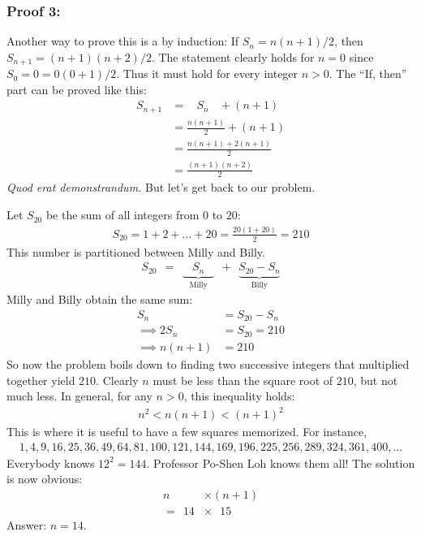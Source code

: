 \documentclass[12pt]{article}
\begin{document}
\begin{answer}
\subsubsection*{Proof 3:}
Another way to prove this is a by induction: If $S_{n}=n(n+1)/2$, then $S_{n+1}=(n+1)(n+2)/2$. The statement clearly holds for $n=0$ since $S_{0} = 0 = 0 (0+1)/2$. Thus it must hold for every integer $n>0$. The ``If, then'' part can be proved like this:
\begin{align*}
S_{n+1} 
  & = ~~~~ S_{n} ~~~~+ (n+1) \\
  & = \frac{n(n+1)}{2} + (n+1) \\
  & = \frac{n(n+1)+2(n+1)}{2} \\
  & = \frac{(n+1)(n+2)}{2}
\end{align*}
\textit{Quod erat demonstrandum.} But let's get back to our problem.
\bigskip

Let $S_{20}$ be the sum of all integers from $0$ to $20$:
\begin{align*}
S_{20} = 1 + 2 + \ldots + 20 
= \frac{20(1+20)}{2}
= 210
\end{align*}
This number is partitioned between Milly and Billy.
\begin{align*}
S_{20} ~~ = ~~ \underbrace{~~~~S_{n}~~~~}_{\text{Milly}} ~~+~~ \underbrace{S_{20}-S_{n}}_{\text{Billy}}
\end{align*}
Milly and Billy obtain the same sum: 
\begin{align*}
S_{n} & = S_{20}-S_{n} \\
\implies 
2S_{n} & = S_{20} = 210 \\
\implies 
n (n+1) & = 210
\end{align*}
So now the problem boils down to finding two successive integers that multiplied together yield $210$. Clearly $n$ must be less than the square root of $210$, but not much less. In general, for any $n>0$, this inequality holds:
\begin{align*}
n^2 < n(n+1) < (n+1)^2
\end{align*}
This is where it is useful to have a few squares memorized. For instance,
\begin{align*}
1, 4, 9, 16, 25, 36, 49, 64, 81, 100, 121, 144, 169, 196, 225, 256, 289, 324, 361, 400, \ldots 
\end{align*}
Everybody knows $12^2=144$. Professor Po-Shen Loh knows them all! The solution is now obvious:
\begin{align*}
n  & \times (n+1) \\
= ~~ 14 & \times ~~~ 15
\end{align*}
Answer: $n=14$.
\end{answer}
\end{document}
